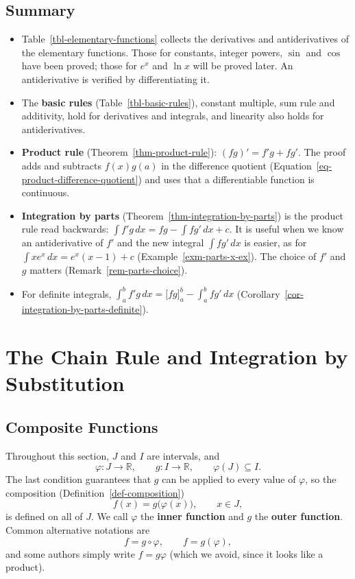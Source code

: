 \documentclass[
  letterpaper,
  DIV=11,
  numbers=noendperiod]{scrreprt}
\providecommand{\tightlist}{%
  \setlength{\itemsep}{0pt}\setlength{\parskip}{0pt}}
\theoremstyle{plain}
\theoremstyle{plain}
\theoremstyle{definition}
\theoremstyle{definition}
\theoremstyle{definition}
\theoremstyle{plain}
\theoremstyle{plain}
\theoremstyle{remark}
\begin{document}
\section{Summary}\label{summary-14}

\begin{itemize}
\tightlist
\item
  Table~\ref{tbl-elementary-functions} collects the derivatives and
  antiderivatives of the elementary functions. Those for constants,
  integer powers, \(\sin\) and \(\cos\) have been proved; those for
  \(e^x\) and \(\ln x\) will be proved later. An antiderivative is
  verified by differentiating it.
\item
  The \textbf{basic rules} (Table~\ref{tbl-basic-rules}), constant
  multiple, sum rule and additivity, hold for derivatives and integrals,
  and linearity also holds for antiderivatives.
\item
  \textbf{Product rule} (Theorem~\ref{thm-product-rule}):
  \((fg)' = f'g + fg'\). The proof adds and subtracts \(f(x)g(a)\) in
  the difference quotient
  (Equation~\ref{eq-product-difference-quotient}) and uses that a
  differentiable function is continuous.
\item
  \textbf{Integration by parts} (Theorem~\ref{thm-integration-by-parts})
  is the product rule read backwards:
  \(\int f'g\,dx = fg - \int fg'\,dx + c\). It is useful when we know an
  antiderivative of \(f'\) and the new integral \(\int fg'\,dx\) is
  easier, as for \(\int x e^x\,dx = e^x(x-1)+c\)
  (Example~\ref{exm-parts-x-ex}). The choice of \(f'\) and \(g\) matters
  (Remark~\ref{rem-parts-choice}).
\item
  For definite integrals,
  \(\int_a^b f'g\,dx = \big[fg\big]_a^b - \int_a^b fg'\,dx\)
  (Corollary~\ref{cor-integration-by-parts-definite}).
\end{itemize}

\chapter{The Chain Rule and Integration by
Substitution}\label{the-chain-rule-and-integration-by-substitution}

\section{Composite Functions}\label{composite-functions}

Throughout this section, \(J\) and \(I\) are intervals, and \[
\varphi\colon J\to\mathbb{R}, \qquad g\colon I\to\mathbb{R}, \qquad \varphi(J)\subseteq I .
\] The last condition guarantees that \(g\) can be applied to every
value of \(\varphi\), so the composition
(Definition~\ref{def-composition}) \[
f(x) = g\big(\varphi(x)\big), \qquad x\in J,
\] is defined on all of \(J\). We call \(\varphi\) the \textbf{inner
function} and \(g\) the \textbf{outer function}. Common alternative
notations are \[
f = g\circ\varphi, \qquad f = g(\varphi),
\] and some authors simply write \(f = g\varphi\) (which we avoid, since
it looks like a product).
\end{document}
